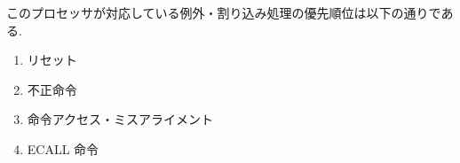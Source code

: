\documentclass[../specifications.tex]{subfiles}
\begin{document}

  このプロセッサが対応している例外・割り込み処理の優先順位は以下の通りである.
  \begin{enumerate}
    \item リセット
    \item 不正命令
    \item 命令アクセス・ミスアライメント
    \item ECALL 命令
  \end{enumerate}
\end{document}

